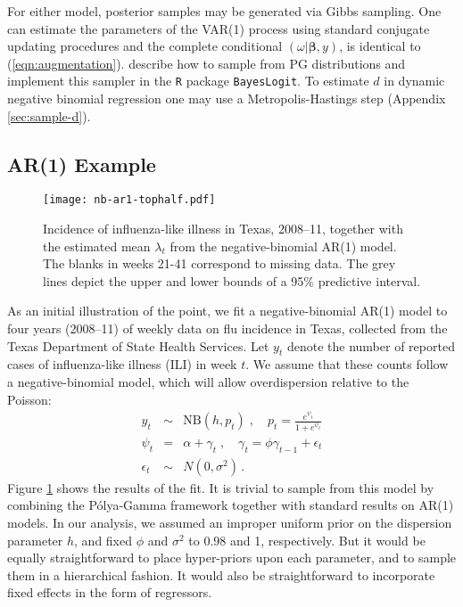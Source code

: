 \documentclass[11pt]{article}
\newcommand{\Polya}{P\'{o}lya}
\newcommand{\PG}{\text{PG}}
\newcommand{\bbeta}{\boldsymbol{\beta}}
\begin{document}
For either model, posterior samples may be generated via Gibbs sampling.  One
can estimate the parameters of the VAR(1) process using standard conjugate
updating procedures and the complete conditional $(\omega | \bbeta, y)$, is
identical to (\ref{eqn:augmentation}).  \cite{polson-etal-2012} describe how to
sample from $\PG$ distributions and implement this sampler in the \texttt{R}
package \texttt{BayesLogit}.  To estimate $d$ in dynamic negative binomial
regression one may use a Metropolis-Hastings step (Appendix \ref{sec:sample-d}).

\subsection{AR(1) Example}

\begin{figure}
\begin{center}
\texttt{[image: nb-ar1-tophalf.pdf]}
\caption{\label{fig:nb-ar1} Incidence of influenza-like illness in Texas,
  2008--11, together with the estimated mean $\lambda_t$ from the
  negative-binomial AR(1) model.  The blanks in weeks 21-41 correspond to
  missing data.  The grey lines depict the upper and lower bounds of a 95$\%$
  predictive interval.}
\end{center}
\end{figure}

As an initial illustration of the point, we fit a negative-binomial AR(1) model
to four years (2008--11) of weekly data on flu incidence in Texas, collected
from the Texas Department of State Health Services.  Let $y_t$ denote the number
of reported cases of influenza-like illness (ILI) in week $t$.  We assume that
these counts follow a negative-binomial model, which will allow overdispersion
relative to the Poisson:
\begin{eqnarray*}
y_t &\sim& \mbox{NB}(h, p_t) \; , \quad p_t= \frac{e^{\psi_t}}{1+e^{\psi_t}} \\
\psi_t &=& \alpha + \gamma_t  \; , \quad \gamma_t = \phi \gamma_{t-1} + \epsilon_t \\
\epsilon_t &\sim& N(0, \sigma^2) \, .
\end{eqnarray*}
Figure \ref{fig:nb-ar1} shows the results of the fit.  It is trivial to sample
from this model by combining the \Polya-Gamma framework together with standard
results on AR(1) models.  In our analysis, we assumed an improper uniform prior
on the dispersion parameter $h$, and fixed $\phi$ and $\sigma^2$ to $0.98$ and
1, respectively.  But it would be equally straightforward to place hyper-priors
upon each parameter, and to sample them in a hierarchical fashion.  It would
also be straightforward to incorporate fixed effects in the form of regressors.
\end{document}
